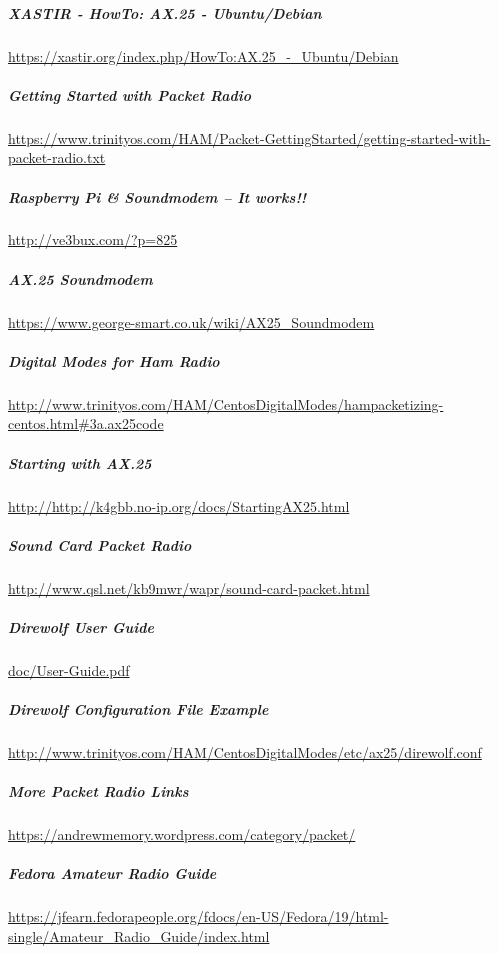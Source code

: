 \subparagraph{XASTIR - HowTo: AX.25 - Ubuntu/Debian}

\href{https://xastir.org/index.php/HowTo:AX.25\_-\_Ubuntu/Debian}{https://xastir.org/index.php/HowTo:AX.25\_-\_Ubuntu/Debian}

\subparagraph{Getting Started with Packet Radio}

\href{https://www.trinityos.com/HAM/Packet-GettingStarted/getting-started-with-packet-radio.txt}{https://www.trinityos.com/HAM/Packet-GettingStarted/getting-started-with-packet-radio.txt}

\subparagraph{Raspberry Pi \& Soundmodem -- It works!!}

\href{http://ve3bux.com/?p=825}{http://ve3bux.com/?p=825}

\subparagraph{AX.25 Soundmodem}

\href{https://www.george-smart.co.uk/wiki/AX25\_Soundmodem}{https://www.george-smart.co.uk/wiki/AX25\_Soundmodem}

\subparagraph{Digital Modes for Ham Radio}

\href{http://www.trinityos.com/HAM/CentosDigitalModes/hampacketizing-centos.html\#3a.ax25code}{http://www.trinityos.com/HAM/CentosDigitalModes/hampacketizing-centos.html\#3a.ax25code}

\subparagraph{Starting with AX.25}

\href{http://k4gbb.no-ip.org/docs/StartingAX25.html}{http://http://k4gbb.no-ip.org/docs/StartingAX25.html}

\subparagraph{Sound Card Packet Radio}

\href{http://www.qsl.net/kb9mwr/wapr/sound-card-packet.html}{http://www.qsl.net/kb9mwr/wapr/sound-card-packet.html}

\subparagraph{Direwolf User Guide}

\href{https://github.com/wb2osz/direwolf/blob/master/doc/User-Guide.pdf}{doc/User-Guide.pdf}

\subparagraph{Direwolf Configuration File Example}

\href{http://www.trinityos.com/HAM/CentosDigitalModes/etc/ax25/direwolf.conf}{http://www.trinityos.com/HAM/CentosDigitalModes/etc/ax25/direwolf.conf}

\subparagraph{More Packet Radio Links}

\href{https://andrewmemory.wordpress.com/category/packet/}{https://andrewmemory.wordpress.com/category/packet/}

\subparagraph{Fedora Amateur Radio Guide}

\href{https://jfearn.fedorapeople.org/fdocs/en-US/Fedora/19/html-single/Amateur\_Radio\_Guide/index.html}{https://jfearn.fedorapeople.org/fdocs/en-US/Fedora/19/html-single/Amateur\_Radio\_Guide/index.html}

